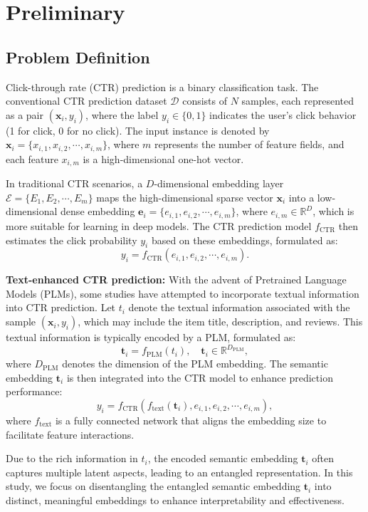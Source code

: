 \chapter{Preliminary}

\section{Problem Definition}

Click-through rate (CTR) prediction is a binary classification task. The conventional CTR prediction dataset $\mathcal{D}$ consists of $N$ samples, each represented as a pair $(\mathbf{x}_i, y_i)$, where the label $y_i \in \{0, 1\}$ indicates the user’s click behavior (1 for click, 0 for no click). The input instance is denoted by $\mathbf{x}_i = \{x_{i,1}, x_{i,2}, \cdots, x_{i,m}\}$, where $m$ represents the number of feature fields, and each feature $x_{i,m}$ is a high-dimensional one-hot vector.

In traditional CTR scenarios, a $D$-dimensional embedding layer $\mathcal{E} = \{E_1, E_2, \cdots, E_m\}$ maps the high-dimensional sparse vector $\mathbf{x}_i$ into a low-dimensional dense embedding $\mathbf{e}_i = \{e_{i,1}, e_{i,2}, \cdots, e_{i,m}\}$, where $e_{i,m} \in \mathbb{R}^{D}$, which is more suitable for learning in deep models. The CTR prediction model $f_{\text{CTR}}$ then estimates the click probability $y_i$ based on these embeddings, formulated as:
\[
y_i = f_{\text{CTR}}(e_{i,1}, e_{i,2}, \cdots, e_{i,m}).
\]

\textbf{Text-enhanced CTR prediction:} With the advent of Pretrained Language Models (PLMs), some studies have attempted to incorporate textual information into CTR prediction. Let $t_i$ denote the textual information associated with the sample $(\mathbf{x}_i, y_i)$, which may include the item title, description, and reviews. This textual information is typically encoded by a PLM, formulated as:
\[
\mathbf{t}_i = f_{\text{PLM}}(t_i), \quad \mathbf{t}_i \in \mathbb{R}^{D_{\text{PLM}}},
\]
where $D_{\text{PLM}}$ denotes the dimension of the PLM embedding. The semantic embedding $\mathbf{t}_i$ is then integrated into the CTR model to enhance prediction performance:
\[
y_i = f_{\text{CTR}}(f_{\text{text}}(\mathbf{t}_i), e_{i,1}, e_{i,2}, \cdots, e_{i,m}),
\]
where $f_{\text{text}}$ is a fully connected network that aligns the embedding size to facilitate feature interactions.

Due to the rich information in $t_i$, the encoded semantic embedding $\mathbf{t}_i$ often captures multiple latent aspects, leading to an entangled representation. In this study, we focus on disentangling the entangled semantic embedding $\mathbf{t}_i$ into distinct, meaningful embeddings to enhance interpretability and effectiveness.

